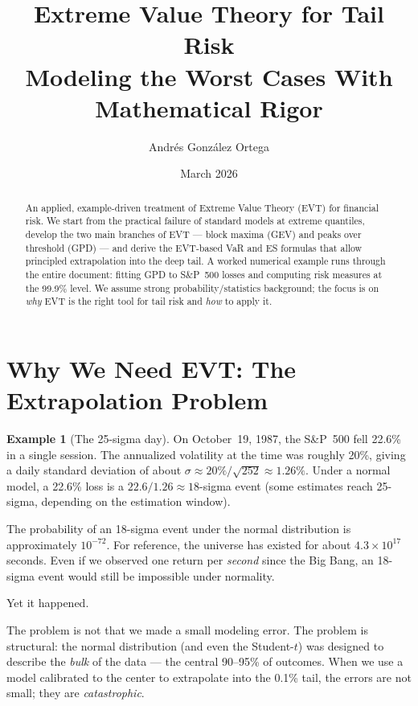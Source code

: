 \documentclass[11pt, a4paper]{article}
\title{%
    \textbf{Extreme Value Theory for Tail Risk} \\[0.5em]
    \large Modeling the Worst Cases With Mathematical Rigor
}
\author{Andr\'es Gonz\'alez Ortega}
\date{March 2026}
\theoremstyle{definition}
\newtheorem{example}{Example}[section]
\theoremstyle{plain}
\theoremstyle{remark}
\begin{document}
\maketitle

\begin{abstract}
An applied, example-driven treatment of Extreme Value Theory (EVT) for financial risk.
We start from the practical failure of standard models at extreme quantiles,
develop the two main branches of EVT --- block maxima (GEV) and peaks over threshold (GPD) ---
and derive the EVT-based VaR and ES formulas that allow principled extrapolation into the deep tail.
A worked numerical example runs through the entire document: fitting GPD to S\&P~500 losses
and computing risk measures at the 99.9\% level.
We assume strong probability/statistics background; the focus is on \emph{why} EVT is the right tool for tail risk
and \emph{how} to apply it.
\end{abstract}

\tableofcontents
\newpage

\section{Why We Need EVT: The Extrapolation Problem}
\label{sec:why-evt}

\begin{example}[The 25-sigma day]\label{ex:25sigma}
On October~19, 1987, the S\&P~500 fell 22.6\% in a single session.
The annualized volatility at the time was roughly 20\%, giving a daily standard deviation of about
$\sigma \approx 20\% / \sqrt{252} \approx 1.26\%$.
Under a normal model, a 22.6\% loss is a $22.6 / 1.26 \approx 18$-sigma event
(some estimates reach 25-sigma, depending on the estimation window).

The probability of an 18-sigma event under the normal distribution is approximately $10^{-72}$.
For reference, the universe has existed for about $4.3 \times 10^{17}$ seconds.
Even if we observed one return per \emph{second} since the Big Bang,
an 18-sigma event would still be impossible under normality.

Yet it happened.
\end{example}

The problem is not that we made a small modeling error.
The problem is structural: the normal distribution (and even the Student-$t$)
was designed to describe the \emph{bulk} of the data --- the central 90--95\% of outcomes.
When we use a model calibrated to the center to extrapolate into the 0.1\% tail,
the errors are not small; they are \emph{catastrophic}.
\end{document}
